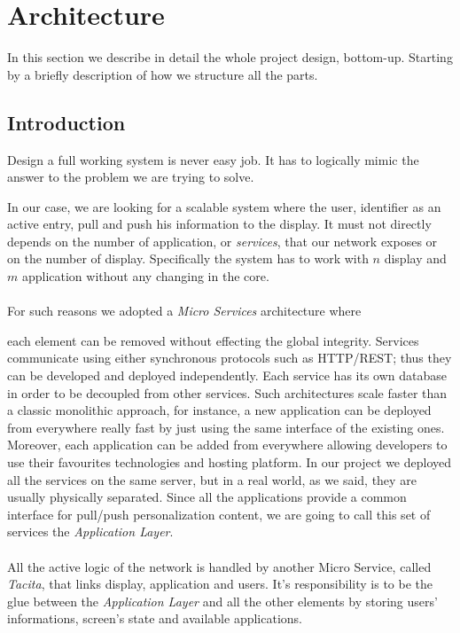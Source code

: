 \documentclass[]{usiinfbachelorproject}
\begin{document}
\section{Architecture}
In this section we describe in detail the whole project design, bottom-up. Starting by a briefly description of how we structure all the parts.
\subsection{Introduction}
Design a full working system is never easy job. It has to logically mimic the answer to the problem we are trying to solve.

In our case, we are looking for a scalable system where the user, identifier as an active entry, pull and push his information to the display. It must not directly depends on the number of application, or \emph{services}, that our network exposes or on the number of display. Specifically the system has to work with $n$ display and $m$ application without any changing in the core. 
\\
\\
For such reasons we adopted a \emph{Micro Services} architecture where 

each element can be removed without effecting the global integrity. Services communicate using either synchronous protocols such as HTTP/REST; thus they can be developed and deployed independently. Each service has its own database in order to be decoupled from other services. Such architectures scale faster than a classic monolithic approach, for instance, a new application can be deployed from everywhere really fast by just using the same interface of the existing ones. Moreover, each application can be added from everywhere allowing developers to use their favourites technologies and hosting platform.
In our project we deployed all the services on the same server, but in a real world, as we said,  they are usually physically separated. Since all the applications provide a common interface for pull/push personalization content, we are going to call this set of services the \emph{Application Layer}.\\
\\
All the active logic of the network is handled by another Micro Service, called \emph{Tacita}, that links display, application and users. It's responsibility is to be the glue between the \emph{Application Layer} and all the other elements by storing users' informations, screen's state and available applications.
\end{document}
